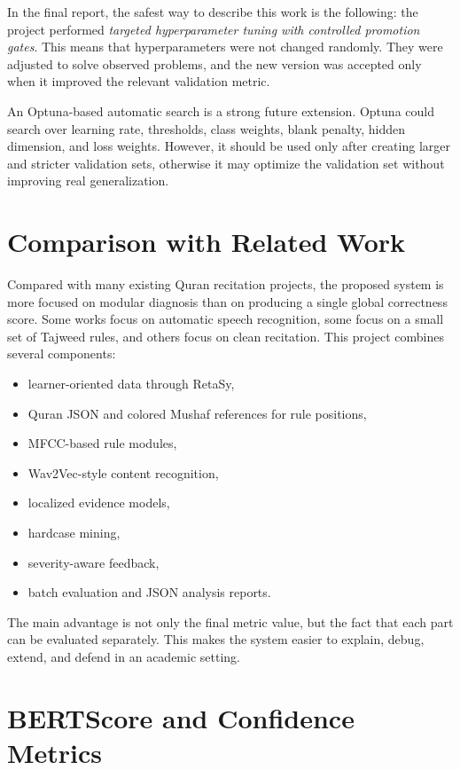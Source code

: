 In the final report, the safest way to describe this work is the following:
the project performed \textit{targeted hyperparameter tuning with controlled
promotion gates}. This means that hyperparameters were not changed randomly.
They were adjusted to solve observed problems, and the new version was accepted
only when it improved the relevant validation metric.

An Optuna-based automatic search is a strong future extension. Optuna could
search over learning rate, thresholds, class weights, blank penalty, hidden
dimension, and loss weights. However, it should be used only after creating
larger and stricter validation sets, otherwise it may optimize the validation
set without improving real generalization.

\section{Comparison with Related Work}

Compared with many existing Quran recitation projects, the proposed system is
more focused on modular diagnosis than on producing a single global correctness
score. Some works focus on automatic speech recognition, some focus on a small
set of Tajweed rules, and others focus on clean recitation. This project
combines several components:

\begin{itemize}[leftmargin=*]
    \item learner-oriented data through RetaSy,
    \item Quran JSON and colored Mushaf references for rule positions,
    \item MFCC-based rule modules,
    \item Wav2Vec-style content recognition,
    \item localized evidence models,
    \item hardcase mining,
    \item severity-aware feedback,
    \item batch evaluation and JSON analysis reports.
\end{itemize}

The main advantage is not only the final metric value, but the fact that each
part can be evaluated separately. This makes the system easier to explain,
debug, extend, and defend in an academic setting.

\section{BERTScore and Confidence Metrics}

